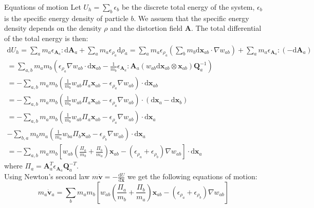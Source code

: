 \documentclass[oneside, a4paper, onecolumn, 11pt]{article}
\renewcommand{\AA}{\mathbf{A}}
\newcommand{\vv}{\mathbf{v}}
\newcommand{\xx}{\mathbf{x}}
\newcommand{\diff}{\mathrm{d}}
\newcommand{\QQ}{\mathbf{Q}}
\begin{document}
\begin{subsection} {Equations of motion}
Let $U_h = \sum_b \epsilon_b$ be the discrete total energy of the system, $\epsilon_b$ is the specific energy 
density of particle $b$. We assuem that the specific energy density depends on the density $\rho$ and the 
distortion field $\AA$. The total differential of the total energy is then: 
\begin{equation}
    \begin{aligned} 
    \diff U_h = \sum_a m_a \epsilon_{\AA_a} : \diff \AA_a + \sum_a m_a \epsilon_{\rho_a} \diff \rho_a
    = \sum_a m_a \epsilon_{\rho_a} \left( \sum_b m_b \diff \xx_{ab} \cdot \nabla w_{ab} \right)
    + \sum_a m_a \epsilon_{\AA_a} : \left( - \diff \AA_a \right) \\
    = \sum_{a,b} m_a m_b  \left( \epsilon_{\rho_a} \nabla w_{ab} \cdot \diff 
    \xx_{ab} - \frac{1}{m_b} \epsilon_{\AA_a} : \AA_a 
    \left( w_{ab} \diff \xx_{ab} \otimes \xx_{ab}\right) \QQ_a^{-1}
    \right) \\
    = -\sum_{a,b} m_a m_b \left(\frac{1}{m_b} w_{ab} \Pi_a \xx_{ab} - 
    \epsilon_{\rho_a} \nabla w_{ab}  \right) \cdot \diff \xx_{ab}\\
    = -\sum_{a,b} m_a m_b \left(\frac{1}{m_b} w_{ab} \Pi_a \xx_{ab} - 
    \epsilon_{\rho_a} \nabla w_{ab}  \right) \cdot \left(\diff \xx_a - \diff \xx_b\right)\\
    = -\sum_{a,b} m_a m_b \left(\frac{1}{m_b} w_{ab} \Pi_a \xx_{ab} - 
    \epsilon_{\rho_a} \nabla w_{ab}  \right) \cdot \diff \xx_a \\
    - \sum_{b,a} m_b m_a \left(\frac{1}{m_a} w_{ba} \Pi_b \xx_{ab} - 
    \epsilon_{\rho_b} \nabla w_{ab}  \right) \cdot \diff \xx_a\\ 
    = -\sum_{a,b} m_a m_b \left[ w_{ab} \left( \frac{\Pi_a}{m_b} + \frac{\Pi_b}{m_a} \right) \xx_{ab} 
    - \left( \epsilon_{\rho_a} + \epsilon_{\rho_b} \right) 
    \nabla w_{ab} \right] \cdot \diff \xx_a
    \end{aligned}
\end{equation} where $\Pi_a = \AA_a^T \epsilon_{\AA_a} \QQ_a^{-T}$.\\ 
Using Newton's second law $m \dot{\vv} = - \frac{\diff U}{\diff \xx}$ we get the following equations of motion: 
\begin{equation} 
    m_a \dot{\vv}_a = \sum_b m_a m_b \left[ w_{ab} \left( \frac{\Pi_a}{m_b} + \frac{\Pi_b}{m_a}\right) 
    \xx_{ab} - \left( \epsilon_{\rho_a} +
    \epsilon_{\rho_b} \right) \nabla w_{ab} \right] 
\end{equation} 


\end{subsection}
\end{document}
